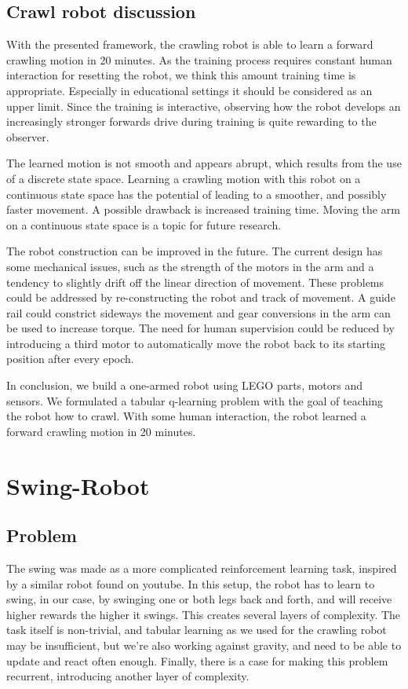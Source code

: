 \documentclass[11pt, a4paper]{article}
\begin{document}
\subsection{Crawl robot discussion}
With the presented framework, the crawling robot is able to learn a forward crawling motion in 20 minutes. As the training process requires constant human interaction for resetting the robot, we think this amount training time is appropriate. Especially in educational settings it should be considered as an upper limit. Since the training is interactive, observing how the robot develops an increasingly stronger forwards drive during training is quite rewarding to the observer. 

The learned motion is not smooth and appears abrupt, which results from the use of a discrete state space. Learning a crawling motion with this robot on a continuous state space has the potential of leading to a smoother, and possibly faster movement. A possible drawback is increased training time. Moving the arm on a continuous state space is a topic for future research.

The robot construction can be improved in the future. The current design has some mechanical issues, such as the strength of the motors in the arm and a tendency to slightly drift off the linear direction of movement. These problems could be addressed by re-constructing the robot and track of movement. A guide rail could constrict sideways the movement and gear conversions in the arm can be used to increase torque. The need for human supervision could be reduced by introducing a third motor to automatically move the robot back to its starting position after every epoch.

\medskip
In conclusion, we build a one-armed robot using LEGO parts, motors and sensors. We formulated a tabular q-learning problem with the goal of teaching the robot how to crawl. With some human interaction, the robot learned a forward crawling motion in 20 minutes. 




\pagebreak
\section{Swing-Robot}
\subsection{Problem}
The swing was made as a more complicated reinforcement learning task, inspired by a similar robot found on youtube\cite{youtube_swing}. In this setup, the robot has to learn to swing, in our case, by swinging one or both legs back and forth, and will receive higher rewards the higher it swings. This creates several layers of complexity. The task itself is non-trivial, and tabular learning as we used for the crawling robot may be insufficient, but we're also working against gravity, and need to be able to update and react often enough. Finally, there is a case for making this problem recurrent, introducing another layer of complexity.
\end{document}
